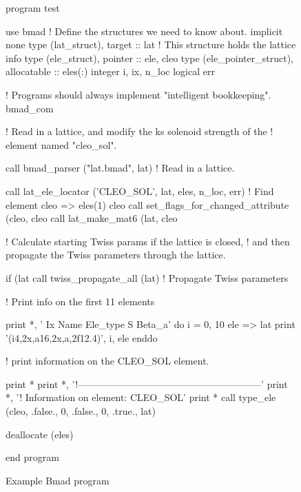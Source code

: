 \begin{figure}[htp]
\begin{listing}{1}
program test

use bmad                 ! Define the structures we need to know about.
implicit none
type (lat_struct), target :: lat   ! This structure holds the lattice info
type (ele_struct), pointer :: ele, cleo
type (ele_pointer_struct), allocatable :: eles(:)
integer i, ix, n_loc
logical err

! Programs should always implement "intelligent bookkeeping".
bmad_com%

! Read in a lattice, and modify the ks solenoid strength of the 
! element named "cleo_sol".

call bmad_parser ("lat.bmad", lat)  ! Read in a lattice.

call lat_ele_locator ('CLEO_SOL', lat, eles, n_loc, err)  ! Find element
cleo => eles(1)%
cleo%
call set_flags_for_changed_attribute (cleo, cleo%
call lat_make_mat6 (lat, cleo%

! Calculate starting Twiss params if the lattice is closed, 
! and then propagate the Twiss parameters through the lattice.

if (lat%
call twiss_propagate_all (lat)      ! Propagate Twiss parameters

! Print info on the first 11 elements

print *, ' Ix  Name              Ele_type                   S      Beta_a'
do i = 0, 10
  ele => lat%
  print '(i4,2x,a16,2x,a,2f12.4)', i, ele%
enddo

! print information on the CLEO_SOL element.

print *
print *, '!---------------------------------------------------------'
print *, '! Information on element: CLEO_SOL'
print *
call type_ele (cleo, .false., 0, .false., 0, .true., lat)

deallocate (eles)

end program
\end{listing}
\caption{Example Bmad program}
\label{f:program}
\end{figure}

